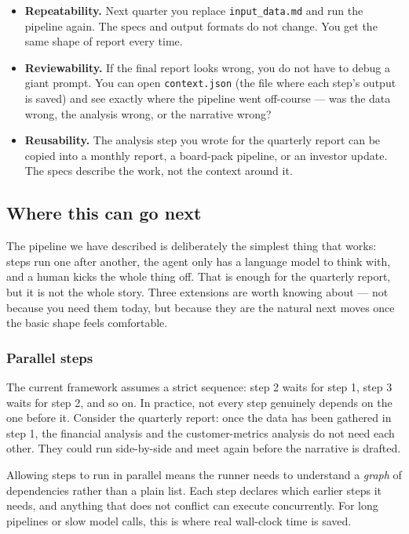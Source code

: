 \documentclass[12pt, a4paper]{article}
\begin{document}
\begin{itemize}[leftmargin=1.5em]
  \item \textbf{Repeatability.} Next quarter you replace \texttt{input\_data.md} and run the pipeline again. The specs and output formats do not change. You get the same shape of report every time.
  \item \textbf{Reviewability.} If the final report looks wrong, you do not have to debug a giant prompt. You can open \texttt{context.json} (the file where each step's output is saved) and see exactly where the pipeline went off-course --- was the data wrong, the analysis wrong, or the narrative wrong?
  \item \textbf{Reusability.} The analysis step you wrote for the quarterly report can be copied into a monthly report, a board-pack pipeline, or an investor update. The specs describe the work, not the context around it.
\end{itemize}

\subsection{Where this can go next}

The pipeline we have described is deliberately the simplest thing that works: steps run one after another, the agent only has a language model to think with, and a human kicks the whole thing off. That is enough for the quarterly report, but it is not the whole story. Three extensions are worth knowing about --- not because you need them today, but because they are the natural next moves once the basic shape feels comfortable.

\subsubsection{Parallel steps}

The current framework assumes a strict sequence: step 2 waits for step 1, step 3 waits for step 2, and so on. In practice, not every step genuinely depends on the one before it. Consider the quarterly report: once the data has been gathered in step 1, the financial analysis and the customer-metrics analysis do not need each other. They could run side-by-side and meet again before the narrative is drafted.

Allowing steps to run in parallel means the runner needs to understand a \textit{graph} of dependencies rather than a plain list. Each step declares which earlier steps it needs, and anything that does not conflict can execute concurrently. For long pipelines or slow model calls, this is where real wall-clock time is saved.
\end{document}
